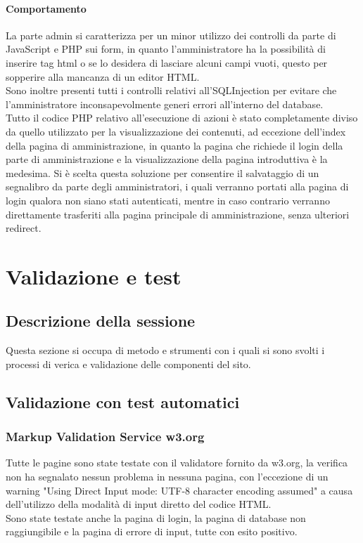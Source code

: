 \documentclass[openany, a4paper, 12pt]{report}
\begin{document}
		\subsubsection{Comportamento}
		La parte admin si caratterizza per un minor utilizzo dei controlli da parte di JavaScript e PHP sui form, in quanto l'amministratore ha la possibilità di inserire tag html o se lo desidera di lasciare alcuni campi vuoti, questo per sopperire alla mancanza di un editor HTML.\\
		Sono inoltre presenti tutti i controlli relativi all'SQLInjection per evitare che l'amministratore inconsapevolmente generi errori all'interno del database.\\
		Tutto il codice PHP relativo all'esecuzione di azioni è stato completamente diviso da quello utilizzato per la visualizzazione dei contenuti, ad eccezione dell'index della pagina di amministrazione, in quanto la pagina che richiede il login della parte di amministrazione e la visualizzazione della pagina introduttiva è la medesima. Si è scelta questa soluzione per consentire il salvataggio di un segnalibro da parte degli amministratori, i quali verranno portati alla pagina di login qualora non siano stati autenticati, mentre in caso contrario verranno direttamente trasferiti alla pagina principale di amministrazione, senza ulteriori redirect.

	\chapter{Validazione e test}
		\section{Descrizione della sessione}
			Questa sezione si occupa di metodo e strumenti con i quali si sono svolti i processi di verica e validazione delle componenti del sito.
		\section{Validazione con test automatici}
			\subsection{Markup Validation Service w3.org}
				Tutte le pagine sono state testate con il validatore fornito da w3.org, la verifica non ha segnalato nessun problema in nessuna pagina, con l'eccezione di un warning "Using Direct Input mode: UTF-8 character encoding assumed" a causa dell'utilizzo della modalità di input diretto del codice HTML.\\
				Sono state testate anche la pagina di login, la pagina di database non raggiungibile e la pagina di errore di input, tutte con esito positivo.
\end{document}
